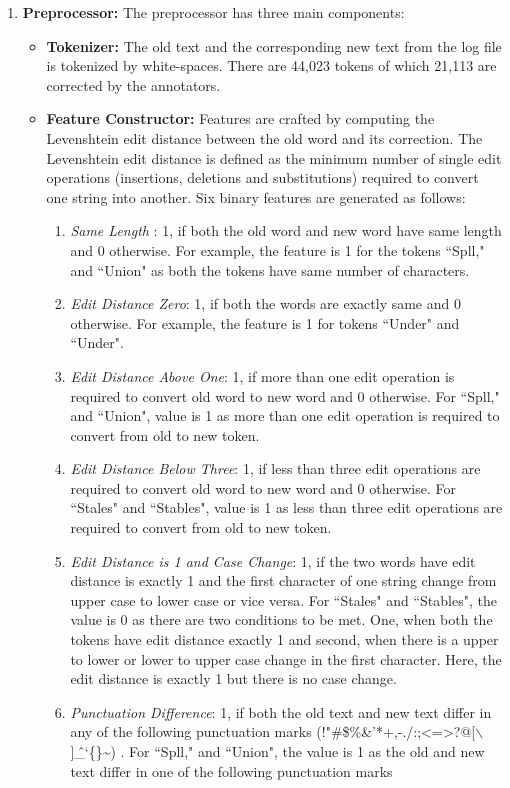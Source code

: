 \documentclass[letterpaper]{article}
\begin{document}
\begin{enumerate}
\item \textbf{Preprocessor: } The preprocessor has three main components:
\begin{itemize}
\item \textbf{Tokenizer: } The old text and the corresponding new text from the log file is tokenized by white-spaces. There are 44,023 tokens of which 21,113 are corrected by the annotators.

\item \textbf{Feature Constructor: } Features are crafted by computing the Levenshtein edit distance between the old word and its correction. The Levenshtein edit distance \cite{Wagner_74} is defined as the minimum number of single edit operations (insertions, deletions and substitutions) required to convert one string into another. Six binary features are generated as follows: 


\begin{enumerate}
\item \textit{Same Length} : 1, if both the old word and new word have same length and $0$ otherwise. For example, the feature is 1 for the tokens ``Spll," and ``Union" as  both the tokens have same number of characters.
\item \textit{Edit Distance Zero}:  1, if both the words are exactly same and $0$ otherwise. For example, the feature is 1 for tokens ``Under" and ``Under". 
\item \textit{Edit Distance Above One}: 1, if more than one edit operation is required to convert old word to new word and $0$ otherwise. For ``Spll," and ``Union", value is 1 as more than one edit operation is required to convert from old to new token.
\item \textit{Edit Distance Below Three}: 1, if less than three edit operations are required to convert old word to new word and $0$ otherwise. For ``Stales" and ``Stables", value is 1 as less than three edit operations are required to convert from old to new token. 
\item \textit{Edit Distance is 1 and Case Change}: 1, if the two words have edit distance is exactly 1 and the first character of one string change from upper case to lower case or vice versa. For ``Stales" and ``Stables", the value is 0 as there are two conditions to be met. One, when both the tokens have edit distance exactly 1 and second, when there is a upper to lower or lower to upper case change in the first character. Here, the edit distance is exactly 1 but there is no case change.
\item \textit{Punctuation Difference}: 1, if both the old text and new text differ in any of the following punctuation marks (!"\#\$\%\&'*+,-./:;\textless=\textgreater?@[$\backslash$]\^\_`\{\textbar\}\textasciitilde)
. For ``Spll," and ``Union", the value is 1 as the old and new text differ in one of the following punctuation marks
\end{enumerate}



\end{itemize}
\end{enumerate}
\end{document}
